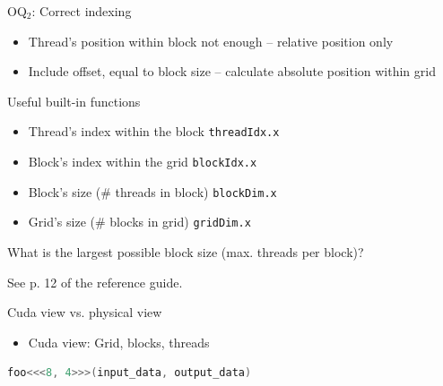 \documentclass[11pt,t]{beamer}
\newcommand{\inline}[1]{ \colorbox{mygray}{\lstinline{#1}}}
\begin{document}
\begin{frame}[fragile]{OQ$_\text{2}$: Correct indexing} 

\begin{small}
\begin{itemize}
    \item Thread's position within block not enough -- relative position only
    \item Include offset, equal to block size -- calculate absolute position within grid
\end{itemize}
\end{small}

\begin{figure}[t]
    \centering
    \begin{center}               
        \resizebox{0.8\columnwidth}{!}{}
    \end{center}
\end{figure}

\end{frame}



\begin{frame}{Useful built-in functions} 

\vspace{0.75 em}

\begin{itemize}
    \setlength\itemsep{0.5 em}
    \item Thread's index within the block \inline{threadIdx.x}
    \item Block's index within the grid \inline{blockIdx.x}
    \item Block's size (\# threads in block) \inline{blockDim.x}
    \item Grid's size  (\# blocks in grid)\inline{gridDim.x}
\end{itemize}

\vspace{1cm}

What is the largest possible block size (max. threads per block)?

See p. 12 of the reference guide.

\end{frame}

\begin{frame}[fragile]{Cuda view vs. physical view} 
    \begin{itemize}
        \item Cuda view: Grid, blocks, threads 
    \end{itemize}
    \centering
    \begin{center}               
        \resizebox{0.8\columnwidth}{!}{}
    \end{center}
    \begin{lstlisting}[language=C++]
        foo<<<8, 4>>>(input_data, output_data)
    \end{lstlisting}
\end{frame}
\end{document}
